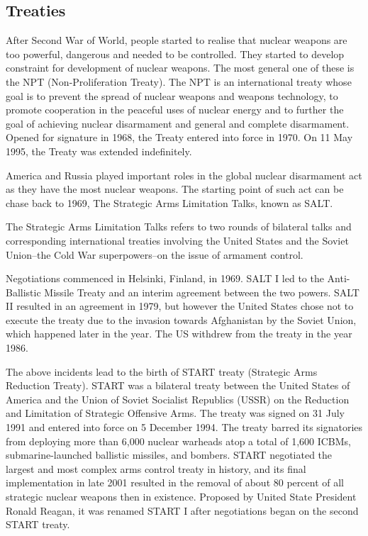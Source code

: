 \documentclass[twoside,titlepage,11pt,twocolumn,a4paper]{article}
\begin{document}
\subsection{Treaties}
After Second War of World, people started to realise that nuclear
weapons are too powerful, dangerous and needed to be controlled. They
started to develop constraint for development of nuclear weapons.  The
most general one of these is the NPT (Non-Proliferation
Treaty). \citep{unoda} The NPT is an international treaty whose goal
is to prevent the spread of nuclear weapons and weapons technology, to
promote cooperation in the peaceful uses of nuclear energy and to
further the goal of achieving nuclear disarmament and general and
complete disarmament.  Opened for signature in 1968, the Treaty
entered into force in 1970.  On 11 May 1995, the Treaty was extended
indefinitely.

America and Russia played important roles in the global nuclear
disarmament act as they have the most nuclear weapons. The starting
point of such act can be chase back to 1969, The Strategic Arms
Limitation Talks, known as SALT.

The Strategic Arms Limitation Talks refers to two rounds of bilateral
talks and corresponding international treaties involving the United
States and the Soviet Union--the Cold War superpowers--on the issue of
armament control.

Negotiations commenced in Helsinki, Finland, in 1969. SALT I led to
the Anti-Ballistic Missile Treaty and an interim agreement between the
two powers. \citep{burr2001} SALT II resulted in an agreement in 1979,
but however the United States chose not to execute the treaty due to
the invasion towards Afghanistan by the Soviet Union, which happened
later in the year. The US withdrew from the treaty in the year 1986.

The above incidents lead to the birth of START treaty (Strategic Arms
Reduction Treaty). \citep{startI} START was a bilateral treaty between
the United States of America and the Union of Soviet Socialist
Republics (USSR) on the Reduction and Limitation of Strategic
Offensive Arms. The treaty was signed on 31 July 1991 and entered into
force on 5 December 1994.  The treaty barred its signatories from
deploying more than 6,000 nuclear warheads atop a total of 1,600
ICBMs, submarine-launched ballistic missiles, and bombers. START
negotiated the largest and most complex arms control treaty in
history, and its final implementation in late 2001 resulted in the
removal of about 80 percent of all strategic nuclear weapons then in
existence. Proposed by United State President Ronald Reagan, it was
renamed START I after negotiations began on the second START treaty.
\end{document}

